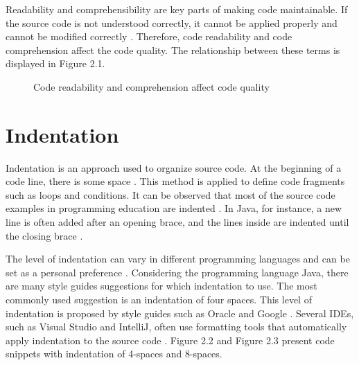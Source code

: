 Readability and comprehensibility are key parts of making code maintainable. 
If the source code is not understood correctly, it cannot be applied properly and cannot be modified correctly \cite{izu2025introducing}. Therefore, code readability and code comprehension affect the code quality. The relationship between these terms is displayed in Figure 2.1.



\begin{figure}[H]
\centering
{}
\caption{Code readability and  comprehension affect code quality}
\label{fig:readability-comprehension-quality}
\end{figure}




\section{Indentation}

Indentation is an approach used to organize source code. At the beginning of a code line, there is some space \cite{morzeck2023indentation}.
This method is applied to define code fragments such as loops and conditions.  It can be observed that most of the source code examples in programming education are indented \cite{morzeck2023indentation}. In Java, for instance, a new line is often added after an opening brace, and the lines inside are indented until the closing brace \cite{hanenberg2024indentation}.


The level of indentation can vary in different programming languages and can be set as a personal preference \cite{bauer2017indentations}. Considering the programming language Java, there are many style guides suggestions for which indentation to use. The most commonly used suggestion is an indentation of four spaces. This level of indentation is proposed by style guides such as Oracle and Google \cite{bauer2017indentations}.
Several IDEs, such as Visual Studio and IntelliJ, often use formatting tools that automatically apply indentation to the source code \cite{morzeck2023indentation}. Figure 2.2 and Figure 2.3 present code snippets with indentation of 4-spaces and 8-spaces.


